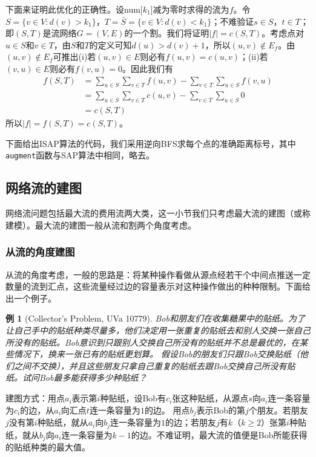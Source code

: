 \documentclass[a4paper]{ctexbook}
\newtheorem{example}{例}[chapter]
\begin{document}
  下面来证明此优化的正确性。设num[$k_1$]减为零时求得的流为$f$。令$S=\{v\in V\colon d(v)>k_1\}$，$T=\bar{S}=\{v\in V\colon d(v)<k_1\}$；不难验证$s\in S$，$t\in T$；即$(S,T)$是流网络$G=(V,E)$的一个割。我们将证明$|f|=c(S,T)$。考虑点对$u\in S$和$v\in T$，由$S$和$T$的定义可知$d(u)>d(v)+1$，所以$(u,v)\notin E_f$。由$(u,v)\notin E_f$可推出(i)若$(u,v)\in E$则必有$f(u,v) = c(u,v)$；(ii)若$(v,u)\in E$则必有$f(v,u)=0$。因此我们有
  \begin{align*}
    f(S,T) &= \sum_{u\in S}\sum_{v\in T}f(u,v)-\sum_{v\in T}\sum_{u\in S}f(v,u)\\
    &= \sum_{u\in S}\sum_{v\in T}c(u,v)-\sum_{v\in T}\sum_{u\in S}0\\
    &= c(S,T)
  \end{align*}
  所以$|f|=f(S,T)=c(S,T)$。%

  下面给出ISAP算法的代码，我们采用逆向BFS求每个点的准确距离标号，其中\texttt{augment}函数与SAP算法中相同，略去。
  
  \subsection{网络流的建图}
  网络流问题包括最大流的费用流两大类，这一小节我们只考虑最大流的建图（或称建模）。最大流的建图一般从流和割两个角度考虑。
  \subsubsection{从流的角度建图}
  从流的角度考虑，一般的思路是：将某种操作看做从源点经若干个中间点推送一定数量的流到汇点，这些流量经过边的容量表示对这种操作做出的种种限制。下面给出一个例子。
  \begin{example}[Collector's Problem, UVa 10779]
    Bob和朋友们在收集糖果中的贴纸。为了让自己手中的贴纸种类尽量多，他们决定用一张重复的贴纸去和别人交换一张自己所没有的贴纸。Bob意识到只跟别人交换自己所没有的贴纸并不总是最优的，在某些情况下，换来一张已有的贴纸更划算。
    假设Bob的朋友们只跟Bob交换贴纸（他们之间不交换），并且这些朋友只拿自己重复的贴纸去跟Bob交换自己所没有贴纸。试问Bob最多能获得多少种贴纸？
  \end{example}
  建图方式：用点$a_i$表示第$i$种贴纸，设Bob有$c_i$张这种贴纸，从源点$s$向$a_i$连一条容量为$c_i$的边，从$a_i$向汇点$t$连一条容量为$1$的边。
  用点$b_j$表示Bob的第$j$个朋友。若朋友$j$没有第$i$种贴纸，就从$a_i$向$b_j$连一条容量为$1$的边；若朋友$j$有$k$（$k\ge 2$）张第$i$种贴纸，就从$b_j$向$a_i$连一条容量为$k-1$的边。不难证明，最大流的值便是Bob所能获得的贴纸种类的最大值。
\end{document}
